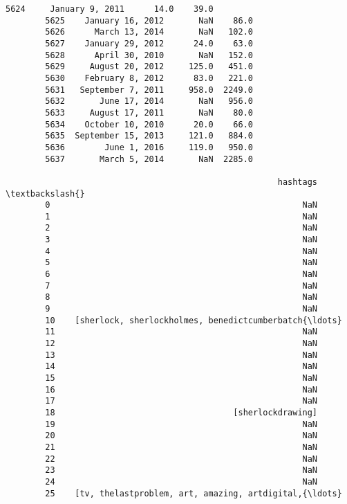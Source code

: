 \documentclass[11pt]{article}
\begin{document}
\begin{Verbatim}[commandchars=\\\{\}]
        5624     January 9, 2011      14.0    39.0   
        5625    January 16, 2012       NaN    86.0   
        5626      March 13, 2014       NaN   102.0   
        5627    January 29, 2012      24.0    63.0   
        5628      April 30, 2010       NaN   152.0   
        5629     August 20, 2012     125.0   451.0   
        5630    February 8, 2012      83.0   221.0   
        5631   September 7, 2011     958.0  2249.0   
        5632       June 17, 2014       NaN   956.0   
        5633     August 17, 2011       NaN    80.0   
        5634    October 10, 2010      20.0    66.0   
        5635  September 15, 2013     121.0   884.0   
        5636        June 1, 2016     119.0   950.0   
        5637       March 5, 2014       NaN  2285.0   
        
                                                       hashtags  \textbackslash{}
        0                                                   NaN   
        1                                                   NaN   
        2                                                   NaN   
        3                                                   NaN   
        4                                                   NaN   
        5                                                   NaN   
        6                                                   NaN   
        7                                                   NaN   
        8                                                   NaN   
        9                                                   NaN   
        10    [sherlock, sherlockholmes, benedictcumberbatch{\ldots}   
        11                                                  NaN   
        12                                                  NaN   
        13                                                  NaN   
        14                                                  NaN   
        15                                                  NaN   
        16                                                  NaN   
        17                                                  NaN   
        18                                    [sherlockdrawing]   
        19                                                  NaN   
        20                                                  NaN   
        21                                                  NaN   
        22                                                  NaN   
        23                                                  NaN   
        24                                                  NaN   
        25    [tv, thelastproblem, art, amazing, artdigital,{\ldots}   

\end{Verbatim}
\end{document}
